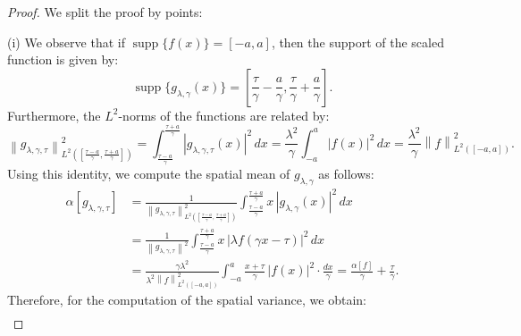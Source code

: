 \documentclass[preprint,hidelinks,authoryear]{elsarticle}
\theoremstyle{plain}
\theoremstyle{definition}
\theoremstyle{remark}
\begin{document}



\begin{proof}
We split the proof by points:

(i)  We observe that if $ \operatorname{supp}\{f(x)\} = [-a, a] $, then the support of the scaled function is given by:
\begin{equation}
    \operatorname{supp}\{g_{\lambda,\gamma}(x)\} = \left[ \frac{\tau}{\gamma}-\frac{a}{\gamma}, \frac{\tau}{\gamma}+\frac{a}{\gamma} \right].
    \label{varsupp}
\end{equation}
Furthermore, the $ L^2 $-norms of the functions are related by:
\begin{equation}
    \left\| g_{\lambda,\gamma,\tau} \right\|^2_{L^2\left( \left[ \frac{\tau-a}{\gamma}, \frac{\tau+a}{\gamma} \right] \right)} 
    = \int_{\frac{\tau-a}{\gamma}}^{\frac{\tau+a}{\gamma}} |g_{\lambda,\gamma,\tau}(x)|^2 \, dx 
    = \frac{\lambda^2}{\gamma} \int_{-a}^{a} |f(x)|^2 \, dx 
    = \frac{\lambda^2}{\gamma} \left\| f \right\|^2_{L^2([-a,a])}.
    \label{uguanorm}
\end{equation}
Using this identity, we compute the spatial mean of $ g_{\lambda,\gamma} $ as follows:
\begin{equation}
\begin{split}
    \alpha[g_{\lambda,\gamma,\tau}] 
    &= \frac{1}{\left\| g_{\lambda,\gamma,\tau} \right\|^2_{L^2\left( \left[ \frac{\tau-a}{\gamma}, \frac{\tau+a}{\gamma} \right] \right)}} \int_{\frac{\tau-a}{\gamma}}^{\frac{\tau+a}{\gamma}} x \, |g_{\lambda,\gamma}(x)|^2 \, dx \\
    &= \frac{1}{\left\| g_{\lambda,\gamma,\tau} \right\|^2} \int_{\frac{\tau-a}{\gamma}}^{\frac{\tau+a}{\gamma}} x \, |\lambda f(\gamma x-\tau)|^2 \, dx \\
    &= \frac{\gamma \lambda^2}{\lambda^2 \left\| f \right\|^2_{L^2([-a,a])}} \int_{-a}^{a} \frac{x+\tau}{\gamma} \, |f(x)|^2 \cdot \frac{dx}{\gamma} 
    = \frac{\alpha[f]}{\gamma}+\displaystyle\frac{\tau}{\gamma}.
\end{split}
\label{medialambagspaziale}
\end{equation}
Therefore, for the computation of the spatial variance, we obtain:
\begin{equation}
\begin{split}

\end{split}
\end{equation}
\end{proof}
\end{document}
